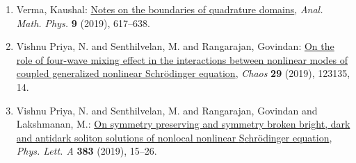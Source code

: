 \begin{enumerate}
\item Verma, Kaushal: \href{https://doi.org/10.1007/s13324-018-0221-0}{Notes on the boundaries of quadrature domains}, \emph{Anal. Math. Phys.} {\bf 9} (2019), 617--638.
\item Vishnu Priya, N. and Senthilvelan, M. and Rangarajan,
Govindan: \href{https://doi.org/10.1063/1.5121245}{On the role of four-wave mixing effect in the interactions
between nonlinear modes of coupled generalized nonlinear
{S}chr\"{o}dinger equation}, \emph{Chaos} {\bf 29} (2019), 123135, 14.
\item Vishnu Priya, N. and Senthilvelan, M. and Rangarajan, Govindan
and Lakshmanan, M.: \href{https://doi.org/10.1016/j.physleta.2018.10.011}{On symmetry preserving and symmetry broken bright, dark and
antidark soliton solutions of nonlocal nonlinear {S}chr\"{o}dinger
equation}, \emph{Phys. Lett. A} {\bf 383} (2019), 15--26.
\end{enumerate}
